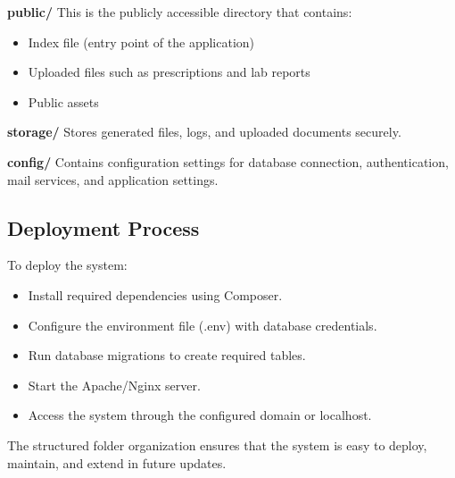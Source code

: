 \textbf{public/}  
This is the publicly accessible directory that contains:
\begin{itemize}
    \item Index file (entry point of the application)
    \item Uploaded files such as prescriptions and lab reports
    \item Public assets
\end{itemize}

\textbf{storage/}  
Stores generated files, logs, and uploaded documents securely.

\textbf{config/}  
Contains configuration settings for database connection, authentication, mail services, and application settings.

\subsection*{Deployment Process}

To deploy the system:

\begin{itemize}
    \item Install required dependencies using Composer.
    \item Configure the environment file (.env) with database credentials.
    \item Run database migrations to create required tables.
    \item Start the Apache/Nginx server.
    \item Access the system through the configured domain or localhost.
\end{itemize}

The structured folder organization ensures that the system is easy to deploy, maintain, and extend in future updates.